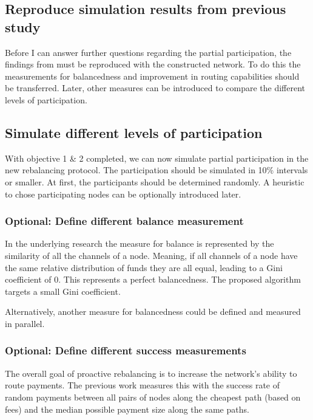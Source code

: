 \documentclass[final]{fhnwreport}       %
\begin{document}
\subsection{Reproduce simulation results from previous study}\label{sec:o_repro}
Before I can answer further questions regarding the partial participation, the findings from \cite{pickhardt_imbalance_2019} must be reproduced with the constructed network. To do this the measurements for balancedness and improvement in routing capabilities should be transferred. Later, other measures can be introduced to compare the different levels of participation.

\subsection{Simulate different levels of participation}\label{sec:o_sim}
With objective 1 \& 2 completed, we can now simulate partial participation in the new rebalancing protocol. The participation should be simulated in 10\% intervals or smaller. At first, the participants should be determined randomly. A heuristic to chose participating nodes can be optionally introduced later.

\subsubsection{Optional: Define different balance measurement}
In the underlying research \cite{pickhardt_imbalance_2019} the measure for balance is represented by the similarity of all the channels of a node. Meaning, if all channels of a node have the same relative distribution of funds they are all equal, leading to a Gini coefficient of $0$. This represents a perfect balancedness. The proposed algorithm targets a small Gini coefficient.

Alternatively, another measure for balancedness could be defined and measured in parallel. 

\subsubsection{Optional: Define different success measurements}
The overall goal of proactive rebalancing is to increase the network's ability to route payments. The previous work \cite{pickhardt_imbalance_2019} measures this with the success rate of random payments between all pairs of nodes along the cheapest path (based on fees) and the median possible payment size along the same paths. 
\end{document}
